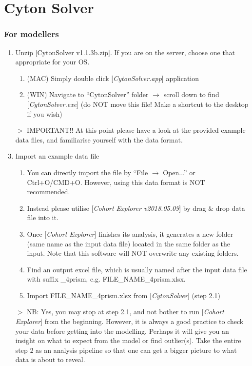 \documentclass{article}
\newcommand{\enterProblemHeader}[1]{
    }
\newcommand{\exitProblemHeader}[1]{
    }
\newcounter{homeworkProblemCounter} %
\newcommand{\homeworkProblemName}{}
\newenvironment{homeworkProblem}[1][Problem \arabic{homeworkProblemCounter}]{ %
    \stepcounter{homeworkProblemCounter} %
    \renewcommand{\homeworkProblemName}{#1} %
    \section{\homeworkProblemName} %
    \enterProblemHeader{\homeworkProblemName} %
    }{
    \exitProblemHeader{\homeworkProblemName} %
    }
\begin{document}
\begin{homeworkProblem}[Cyton Solver]
            \subsubsection{For modellers}
            \begin{enumerate}
                \item Unzip [CytonSolver v1.1.3b.zip]. If you are on the server, choose one that appropriate for your OS.
                \begin{enumerate}
                    \item (MAC) Simply double click [\textit{CytonSolver.app}] application
                    \item (WIN) Navigate to ``CytonSolver'' folder $\rightarrow$ scroll down to find [\textit{CytonSolver.exe}] (do NOT move this file! Make a shortcut to the desktop if you wish)
                \end{enumerate}
                \item[$>$] IMPORTANT!! At this point please have a look at the provided example data files, and familiarise yourself with the data format.
                \item Import an example data file
                \begin{enumerate}
                    \item You can directly import the file by ``File $\rightarrow$ Open...'' or Ctrl+O/CMD+O. However, using this data format is NOT recommended.
                    \item Instead please utilise [\textit{Cohort Explorer v2018.05.09}] by drag \& drop data file into it.
                    \item Once [\textit{Cohort Explorer}] finishes its analysis, it generates a new folder (same name as the input data file) located in the same folder as the input. Note that this software will NOT overwrite any existing folders.
                    \item Find an output excel file, which is usually named after the input data file with suffix \_4prism, e.g. FILE\_NAME\_4prism.xlsx.
                    \item Import FILE\_NAME\_4prism.xlsx from [\textit{CytonSolver}] (step 2.1)
                \end{enumerate}  
                \item[$>$] NB: Yes, you may stop at step 2.1, and not bother to run [\textit{Cohort Explorer}] from the beginning. However, it is always a good practice to check your data before getting into the modelling. Perhaps it will give you an insight on what to expect from the model or find outlier(s). Take the entire step 2 as an analysis pipeline so that one can get a bigger picture to what data is about to reveal.
            \end{enumerate}


\end{homeworkProblem}
\end{document}
